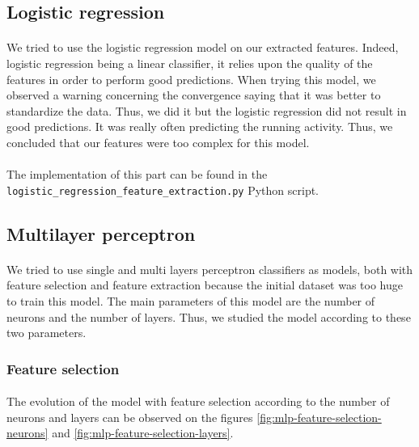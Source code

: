 \documentclass[a4paper, 11pt, oneside]{article}
\begin{document}

\subsection{Logistic regression} \label{subsec:lr}

\paragraph{}We tried to use the logistic regression model on our extracted features. Indeed, logistic regression being a linear classifier, it relies upon the quality of the features in order to perform good predictions.
When trying this model, we observed a warning concerning the convergence saying that it was better to standardize the data. Thus, we did it but the logistic regression did not result in good predictions. It was really often predicting the running activity. 
Thus, we concluded that our features were too complex for this model. 

\paragraph{}The implementation of this part can be found in the \texttt{logistic\_regression\_feature\_extraction.py} Python script.


\subsection{Multilayer perceptron} \label{subsec:mlp}
\paragraph{}We tried to use single and multi layers perceptron classifiers as models, both with feature selection and feature extraction because the initial dataset was too huge to train this model. The main parameters of this model
are the number of neurons and the number of layers. Thus, we studied the model according to these two parameters.

\subsubsection{Feature selection}

\paragraph{}The evolution of the model with feature selection according to the number of neurons and layers can be observed on the figures \ref{fig:mlp-feature-selection-neurons} and \ref{fig:mlp-feature-selection-layers}.
\end{document}
